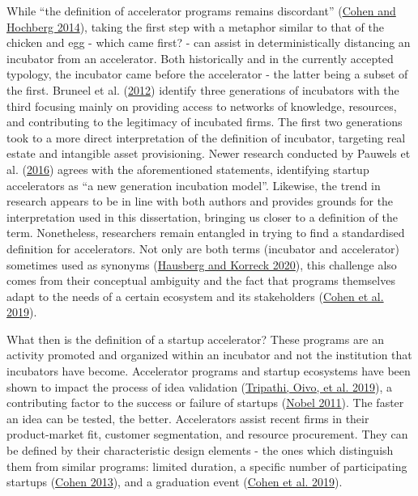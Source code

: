 \documentclass[
  12pt,
]{article}
\begin{document}
While ``the definition of accelerator programs remains discordant'' (\protect\hyperlink{ref-cohen_accelerating_2014}{Cohen and Hochberg 2014}), taking the first step with a metaphor similar to that of the chicken and egg - which came first? - can assist in deterministically distancing an incubator from an accelerator. Both historically and in the currently accepted typology, the incubator came before the accelerator - the latter being a subset of the first. Bruneel et al. (\protect\hyperlink{ref-bruneel_evolution_2012}{2012}) identify three generations of incubators with the third focusing mainly on providing access to networks of knowledge, resources, and contributing to the legitimacy of incubated firms. The first two generations took to a more direct interpretation of the definition of incubator, targeting real estate and intangible asset provisioning. Newer research conducted by Pauwels et al. (\protect\hyperlink{ref-pauwels_understanding_2016}{2016}) agrees with the aforementioned statements, identifying startup accelerators as ``a new generation incubation model''. Likewise, the trend in research appears to be in line with both authors and provides grounds for the interpretation used in this dissertation, bringing us closer to a definition of the term. Nonetheless, researchers remain entangled in trying to find a standardised definition for accelerators. Not only are both terms (incubator and accelerator) sometimes used as synonyms (\protect\hyperlink{ref-hausberg_business_2020}{Hausberg and Korreck 2020}), this challenge also comes from their conceptual ambiguity and the fact that programs themselves adapt to the needs of a certain ecosystem and its stakeholders (\protect\hyperlink{ref-cohen_design_2019}{Cohen et al. 2019}).

What then is the definition of a startup accelerator? These programs are an activity promoted and organized within an incubator and not the institution that incubators have become. Accelerator programs and startup ecosystems have been shown to impact the process of idea validation (\protect\hyperlink{ref-tripathi_startup_2019}{Tripathi, Oivo, et al. 2019}), a contributing factor to the success or failure of startups (\protect\hyperlink{ref-nobel_companies_2011}{Nobel 2011}). The faster an idea can be tested, the better. Accelerators assist recent firms in their product-market fit, customer segmentation, and resource procurement. They can be defined by their characteristic design elements - the ones which distinguish them from similar programs: limited duration, a specific number of participating startups (\protect\hyperlink{ref-cohen_how_2013}{Cohen 2013}), and a graduation event (\protect\hyperlink{ref-cohen_design_2019}{Cohen et al. 2019}).
\end{document}
